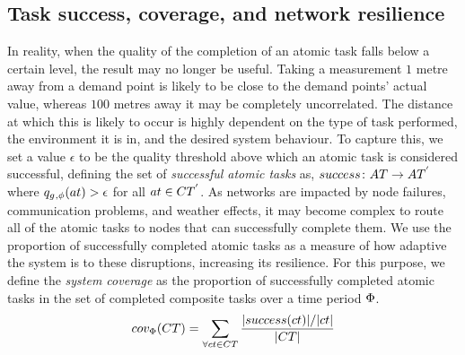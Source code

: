 \subsection{Task success, coverage, and network resilience}

\newcommand{\varQualityMin}[2]{\epsilon}
\newcommand{\formalTasksSuccess}[2]{
	\functionFormal{success}
	{\setAtomicTask{}{}}
	{\setAtomicTask{}{'}}
}
\newcommand{\functionTasksSuccess}[2]{
\ifx&#1&%
	\functionSignature{success}{\setAtomicTask{}{}}
\else
	\functionSignature{success}{#1}
\fi
}

\newcommand{\formalCompositeTaskCoverage}[2]{
	\functionFormal{taskcov}
	{\setCompositeTask{}{}}
	{\setCompositeTask{}{'}}
}
\newcommand{\functionCompositeTaskCoverage}[2]{
	\functionSignature{taskcov}{\setCompositeTask{}{}}
}


\newcommand{\functionSystemCoverage}[2]{
	\functionSignature{cov_{\setTime{}{}}}{\setCompositeTask{}{}}
}

In reality, when the quality of the completion of an atomic task falls below a certain level, the result may no longer be useful. Taking a measurement $1$ metre away from a demand point is likely to be close to the demand points' actual value, whereas $100$ metres away it may be completely uncorrelated. The distance at which this is likely to occur is highly dependent on the type of task performed, the environment it is in, and the desired system behaviour. To capture this, we set a value $\varQualityMin{}{}$ to be the quality threshold above which an atomic task is considered successful, defining the set of \textit{successful atomic tasks} as, $\formalTasksSuccess{}{}$ where $\functionAtomicTaskQualitySignature{}{} > \varQualityMin{}{}$ for all $\varAtomicTask{}{} \in \setCompositeTask{}{'}$.  As networks are impacted by node failures, communication problems, and weather effects, it may become complex to route all of the atomic tasks to nodes that can successfully complete them. We use the proportion of successfully completed atomic tasks as a measure of how adaptive the system is to these disruptions, increasing its resilience.  For this purpose, we define the \textit{system coverage} as the proportion of successfully completed atomic tasks in the set of completed composite tasks over a time period $\Phi$.
\begin{equation}
	\label{eq:coverage}
	\functionSystemCoverage{}{} = \sum\limits_{\forall \varCompositeTask{}{} \in \setCompositeTask{}{}} 
	\frac
	{\funcSize{\functionTasksSuccess{\varCompositeTask{}{}}{}}/\funcSize{\varCompositeTask{}{}}}
	{\funcSize{\setCompositeTask{}{}}{}}
\end{equation}